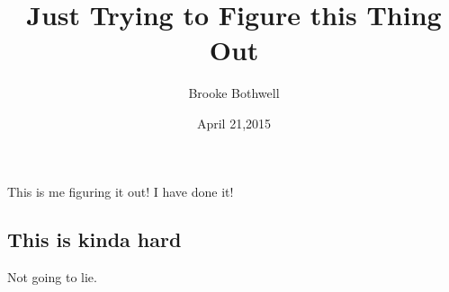 \documentclass{journal}
\title{Just Trying to Figure this Thing Out}
\author{Brooke Bothwell}
\date{April 21,2015}
\begin{document}
	\maketitle
	This is me figuring it out! I have done it!
	\subsection{This is kinda hard}
	Not going to lie.
\end{document}
